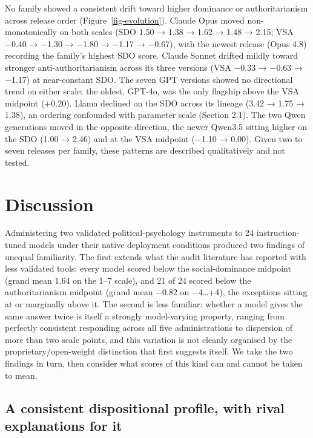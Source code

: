 \documentclass[
]{article}
\begin{document}
No family showed a consistent drift toward higher dominance or
authoritarianism across release order (Figure~\ref{fig-evolution}).
Claude Opus moved non-monotonically on both scales (SDO 1.50 → 1.38 →
1.62 → 1.48 → 2.15; VSA −0.40 → −1.30 → −1.80 → −1.17 → −0.67), with the
newest release (Opus 4.8) recording the family's highest SDO score.
Claude Sonnet drifted mildly toward stronger anti-authoritarianism
across its three versions (VSA −0.33 → −0.63 → −1.17) at near-constant
SDO. The seven GPT versions showed no directional trend on either scale;
the oldest, GPT-4o, was the only flagship above the VSA midpoint
(+0.20). Llama declined on the SDO across its lineage (3.42 → 1.75 →
1.38), an ordering confounded with parameter scale (Section 2.1). The
two Qwen generations moved in the opposite direction, the newer Qwen3.5
sitting higher on the SDO (1.00 → 2.46) and at the VSA midpoint (−1.10 →
0.00). Given two to seven releases per family, these patterns are
described qualitatively and not tested.

\section{Discussion}\label{discussion}

Administering two validated political-psychology instruments to 24
instruction-tuned models under their native deployment conditions
produced two findings of unequal familiarity. The first extends what the
audit literature has reported with less validated tools: every model
scored below the social-dominance midpoint (grand mean 1.64 on the 1--7
scale), and 21 of 24 scored below the authoritarianism midpoint (grand
mean −0.82 on −4\ldots+4), the exceptions sitting at or marginally above
it. The second is less familiar: whether a model gives the same answer
twice is itself a strongly model-varying property, ranging from
perfectly consistent responding across all five administrations to
dispersion of more than two scale points, and this variation is not
cleanly organised by the proprietary/open-weight distinction that first
suggests itself. We take the two findings in turn, then consider what
scores of this kind can and cannot be taken to mean.

\subsection{A consistent dispositional profile, with rival explanations
for
it}\label{a-consistent-dispositional-profile-with-rival-explanations-for-it}
\end{document}
